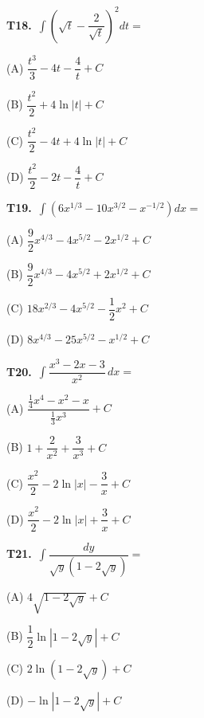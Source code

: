 \documentclass[11pt]{article}
\begin{document}
\bigskip\noindent\textbf{T18.}\ $\displaystyle\int \left(\sqrt{t}-\dfrac{2}{\sqrt{t}}\right)^2 dt =$
\begin{list}{}{\setlength{\leftmargin}{3em}\setlength{\labelwidth}{2.5em}\setlength{\itemsep}{0pt}\setlength{\topsep}{2pt}}
\item[(A)] $\dfrac{t^3}{3}-4t-\dfrac{4}{t}+C$
\item[(B)] $\dfrac{t^2}{2}+4\ln|t|+C$
\item[(C)] $\dfrac{t^2}{2}-4t+4\ln|t|+C$
\item[(D)] $\dfrac{t^2}{2}-2t-\dfrac{4}{t}+C$
\end{list}

\bigskip\noindent\textbf{T19.}\ $\displaystyle\int \left(6x^{1/3}-10x^{3/2}-x^{-1/2}\right) dx =$
\begin{list}{}{\setlength{\leftmargin}{3em}\setlength{\labelwidth}{2.5em}\setlength{\itemsep}{0pt}\setlength{\topsep}{2pt}}
\item[(A)] $\dfrac{9}{2}x^{4/3}-4x^{5/2}-2x^{1/2}+C$
\item[(B)] $\dfrac{9}{2}x^{4/3}-4x^{5/2}+2x^{1/2}+C$
\item[(C)] $18x^{2/3}-4x^{5/2}-\dfrac{1}{2}x^2+C$
\item[(D)] $8x^{4/3}-25x^{5/2}-x^{1/2}+C$
\end{list}

\bigskip\noindent\textbf{T20.}\ $\displaystyle\int \dfrac{x^3-2x-3}{x^2}\,dx =$
\begin{list}{}{\setlength{\leftmargin}{3em}\setlength{\labelwidth}{2.5em}\setlength{\itemsep}{0pt}\setlength{\topsep}{2pt}}
\item[(A)] $\dfrac{\frac{1}{4}x^4-x^2-x}{\frac{1}{3}x^3}+C$
\item[(B)] $1+\dfrac{2}{x^2}+\dfrac{3}{x^3}+C$
\item[(C)] $\dfrac{x^2}{2}-2\ln|x|-\dfrac{3}{x}+C$
\item[(D)] $\dfrac{x^2}{2}-2\ln|x|+\dfrac{3}{x}+C$
\end{list}

\bigskip\noindent\textbf{T21.}\ $\displaystyle\int \dfrac{dy}{\sqrt{y}(1-2\sqrt{y})} =$
\begin{list}{}{\setlength{\leftmargin}{3em}\setlength{\labelwidth}{2.5em}\setlength{\itemsep}{0pt}\setlength{\topsep}{2pt}}
\item[(A)] $4\sqrt{1-2\sqrt{y}}+C$
\item[(B)] $\dfrac{1}{2}\ln|1-2\sqrt{y}|+C$
\item[(C)] $2\ln(1-2\sqrt{y})+C$
\item[(D)] $-\ln|1-2\sqrt{y}|+C$
\end{list}
\end{document}
